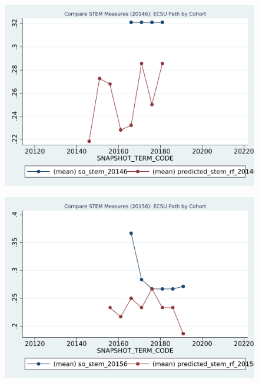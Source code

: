 \newpage
\begin{figure}[h!]
\begin{centering}
\includegraphics[scale=1]{"figures/ECSU_20146_COMPARE_path_by_cohort_CAREER_STEM"}
\end{centering}
\end{figure}
\newpage
\begin{figure}[h!]
\begin{centering}
\includegraphics[scale=1]{"figures/ECSU_20156_COMPARE_path_by_cohort_CAREER_STEM"}
\end{centering}
\end{figure}
\newpage
